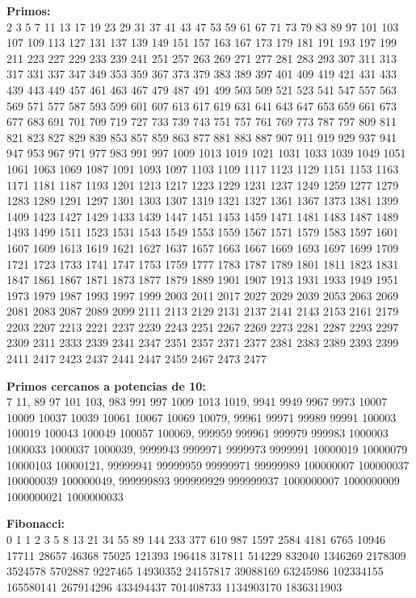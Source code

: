 \documentclass[10pt,landscape,twocolumn,letterpaper,twosided]{article}
\begin{document}
		\textbf{Primos:}\\
		\vspace{3mm}
			2 3 5 7 11 13 17 19 23 29 31 37 41 43 47 53 59 61 67 71 73 79 83 89 97 101 103 107 109 113 127 131 137 139
			149 151 157 163 167 173 179 181 191 193 197 199 211 223 227 229 233 239 241 251 257 263 269 271 277 281 283
			293 307 311 313 317 331 337 347 349 353 359 367 373 379 383 389 397 401 409 419 421 431 433 439 443 449 457
			461 463 467 479 487 491 499 503 509 521 523 541 547 557 563 569 571 577 587 593 599 601 607 613 617 619 631
			641 643 647 653 659 661 673 677 683 691 701 709 719 727 733 739 743 751 757 761 769 773 787 797 809 811 821
			823 827 829 839 853
			857 859 863 877 881 883 887 907 911 919 929 937 941 947 953 967 971 977 983 991 997 1009 1013 1019 1021 1031
			1033 1039 1049 1051 1061 1063 1069 1087 1091 1093 1097 1103 1109 1117 1123 1129 1151 1153 1163 1171 1181 1187
			1193 1201 1213 1217 1223 1229 1231 1237 1249 1259 1277 1279 1283 1289 1291 1297 1301 1303 1307 1319 1321 1327
			1361 1367 1373 1381 1399 1409 1423 1427 1429 1433 1439 1447 1451 1453 1459 1471 1481 1483 1487 1489 1493 1499
			1511 1523 1531 1543 1549 1553 1559 1567 1571 1579 1583 1597 1601 1607 1609 1613 1619 1621 1627 1637 1657 1663
			1667 1669 1693 1697 1699 1709 1721 1723 1733 1741 1747 1753 1759 1777 1783 1787 1789 1801 1811 1823 1831 1847
			1861 1867 1871 1873 1877 1879 1889 1901 1907 1913 1931 1933 1949 1951 1973 1979 1987 1993 1997 1999 2003 2011
			2017 2027 2029 2039 2053 2063 2069 2081 2083 2087 2089 2099 2111 2113 2129 2131 2137 2141 2143 2153 2161 2179
			2203 2207 2213 2221 2237 2239 2243 2251 2267 2269 2273 2281 2287 2293 2297 2309 2311 2333 2339 2341 2347 2351
			2357 2371 2377 2381 2383 2389 2393 2399 2411 2417 2423 2437 2441 2447 2459 2467 2473 2477

	\vspace{8mm}
	\textbf{Primos cercanos a potencias de 10:}\\
	\vspace{3mm}
	7 11, 89 97 101 103, 983 991 997 1009 1013 1019, 
	9941 9949 9967 9973 10007 10009 10037 10039 10061 10067 10069 10079, 
	99961 99971 99989 99991 100003 100019 100043 100049 100057 100069, 
	999959 999961 999979 999983 1000003 1000033 1000037 1000039,
	9999943 9999971 9999973 9999991 10000019 10000079 10000103 10000121,
	99999941 99999959 99999971 99999989 100000007 100000037 100000039 100000049,
	999999893 999999929 999999937 1000000007 1000000009 1000000021 1000000033
	
	\vspace{8mm}
	\textbf{Fibonacci:}\\
	\vspace{3mm}
	0 1 1 2 3 5 8 13 21 34 55 89 144 233 377 610 987 1597 2584 4181 6765 10946 17711 28657 46368 75025 121393 196418 317811
	514229 832040 1346269 2178309 3524578 5702887 9227465 14930352 24157817 39088169 63245986 102334155 165580141 267914296
	433494437 701408733 1134903170 1836311903
	
\end{document}
